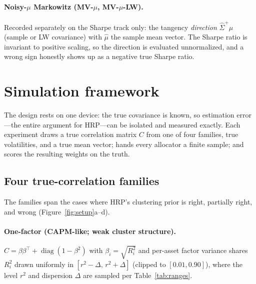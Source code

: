 \documentclass[11pt]{article}
\newcommand{\Sighat}{\widehat{\Sigma}}
\newcommand{\muhat}{\widehat{\mu}}
\begin{document}
\paragraph{Noisy-$\mu$ Markowitz (MV-$\mu$, MV-$\mu$-LW).} Recorded
separately on the Sharpe track only: the tangency \emph{direction}
$\Sighat^{+}\muhat$ (sample or LW covariance) with $\muhat$ the sample mean
vector. The Sharpe ratio is invariant to positive scaling, so the direction
is evaluated unnormalized, and a wrong sign honestly shows up as a negative
true Sharpe ratio.

\section{Simulation framework}
\label{sec:framework}

The design rests on one device: the true covariance is known, so estimation
error---the entire argument for HRP---can be isolated and measured exactly.
Each experiment draws a true correlation matrix $C$ from one of four
families, true volatilities, and a true mean vector; hands every allocator a
finite sample; and scores the resulting weights on the truth.

\subsection{Four true-correlation families}
\label{sec:families}

The families span the cases where HRP's clustering prior is right, partially
right, and wrong (Figure~\ref{fig:setup}a--d).

\paragraph{One-factor (CAPM-like; weak cluster structure).}
$C=\beta\beta^{\top}+\operatorname{diag}(1-\beta^{2})$ with
$\beta_i=\sqrt{R^{2}_i}$ and per-asset factor variance shares $R^{2}_i$
drawn uniformly in $[r^{2}-\Delta,\,r^{2}+\Delta]$ (clipped to
$[0.01,0.90]$), where the level $r^{2}$ and dispersion $\Delta$ are sampled
per Table~\ref{tab:ranges}.
\end{document}
